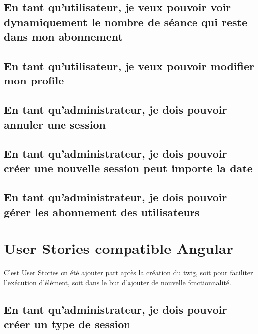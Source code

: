 	\vspace{\baselineskip}
	\vspace{\baselineskip}	
	\subsection{En tant qu’utilisateur, je veux pouvoir voir dynamiquement le nombre de séance qui reste dans mon abonnement}
		

	\vspace{\baselineskip}	
	\subsection{En tant qu'utilisateur, je veux pouvoir modifier mon profile}
		

	\vspace{\baselineskip}
	\subsection{En tant qu’administrateur, je dois pouvoir annuler une session}
		

	\newpage
	\subsection{En tant qu'administrateur, je dois pouvoir créer une nouvelle session peut importe la date}
		

	\vspace{\baselineskip}
	\vspace{\baselineskip}
	\subsection{En tant qu'administrateur, je dois pouvoir gérer les abonnement des utilisateurs}
		
	
		
\section{User Stories compatible Angular}
	\paragraph{}
		C'est User Stories on été ajouter part après la création du twig, soit pour faciliter l'exécution d'élément, soit dans le but d'ajouter de nouvelle fonctionnalité. 
	
	\subsection{En tant qu'administrateur, je dois pouvoir créer un type de session}
		
	
